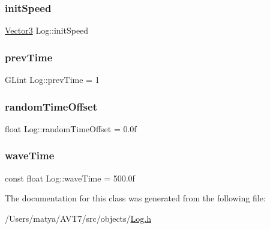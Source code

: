 \subsubsection{\texorpdfstring{init\+Speed}{initSpeed}}
{\footnotesize\ttfamily \hyperlink{class_vector3}{Vector3} Log\+::init\+Speed}

\mbox{\label{class_log_ae1e50d0638372cc9976cc9de946a779b}} 
\subsubsection{\texorpdfstring{prev\+Time}{prevTime}}
{\footnotesize\ttfamily G\+Lint Log\+::prev\+Time = 1}

\mbox{\label{class_log_a427e736b62232ae99203aa37c20eedc0}} 
\subsubsection{\texorpdfstring{random\+Time\+Offset}{randomTimeOffset}}
{\footnotesize\ttfamily float Log\+::random\+Time\+Offset = 0.\+0f}

\mbox{\label{class_log_a95b70921e749674648a01f04834e67df}} 
\subsubsection{\texorpdfstring{wave\+Time}{waveTime}}
{\footnotesize\ttfamily const float Log\+::wave\+Time = 500.\+0f}



The documentation for this class was generated from the following file\+:\begin{DoxyCompactItemize}
\item 
/\+Users/matya/\+A\+V\+T7/src/objects/\hyperlink{_log_8h}{Log.\+h}\end{DoxyCompactItemize}
